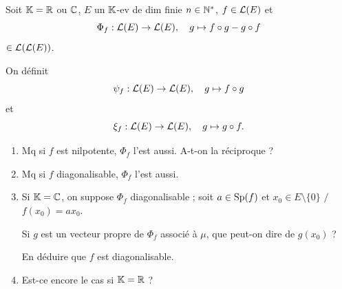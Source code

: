 \begin{statementbox}
Soit $\mathbb K=\mathbb R$ ou $\mathbb C$, $E$ un $\mathbb K$-ev de dim finie $n\in\mathbb N^*$,
$f\in\mathcal L(E)$ et
\[
\Phi_f:\mathcal L(E)\to\mathcal L(E),\quad g\mapsto f\circ g-g\circ f
\]
$\in\mathcal L(\mathcal L(E))$.

On définit
\[
\psi_f:\mathcal L(E)\to\mathcal L(E),\quad g\mapsto f\circ g
\]
et
\[
\xi_f:\mathcal L(E)\to\mathcal L(E),\quad g\mapsto g\circ f.
\]
\begin{enumerate}[label=\alph*)]
  \item Mq si $f$ est nilpotente, $\Phi_f$ l'est aussi. A-t-on la réciproque ?
  \item Mq si $f$ diagonalisable, $\Phi_f$ l'est aussi.
  \item Si $\mathbb K=\mathbb C$, on suppose $\Phi_f$ diagonalisable ; soit
  $a\in\operatorname{Sp}(f)$ et $x_0\in E\setminus\{0\}$ $/$ $f(x_0)=ax_0$.

  Si $g$ est un vecteur propre de $\Phi_f$ associé à $\mu$, que peut-on dire de
  $g(x_0)$ ?

  En déduire que $f$ est diagonalisable.
  \item Est-ce encore le cas si $\mathbb K=\mathbb R$ ?
\end{enumerate}
\end{statementbox}

